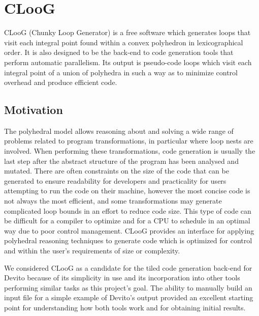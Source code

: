 \documentclass[a4paper,12pt,twoside]{report}
\begin{document}
\section{CLooG}
CLooG (Chunky Loop Generator) is a free software which generates loops that visit each integral
point found within a convex polyhedron in lexicographical order. It is also designed to be
the back-end to code generation tools that perform automatic parallelism. Its output is pseudo-code loops which visit
each integral point of a union of polyhedra in such a way as to minimize control overhead and produce efficient code.

\subsection{Motivation}
The polyhedral model allows reasoning about and solving a wide range of problems related to program transformations,
in particular where loop nests are involved. When performing these transformations, code generation is usually the last
step after the abstract structure of the program has been analysed and mutated. There are often constraints on the size of the code
that can be generated to ensure readability for developers and practicality for users attempting to run the code on their machine,
however the most concise code is not always the most efficient, and some transformations may generate complicated loop bounds in an effort
to reduce code size. This type of code can be difficult for a compiler to optimize and for a CPU to schedule in an optimal way due to
poor control management. CLooG provides an interface for applying polyhedral reasoning techniques to generate code which is optimized for control
and within the user's requirements of size or complexity.

We considered CLooG as a candidate for the tiled code generation back-end for Devito because of its simplicity in use and its incorporation into
other tools performing similar tasks as this project's goal. The ability to manually build an input file for a simple example of Devito's
output provided an excellent starting point for understanding how both tools work and for obtaining initial results.
\end{document}
